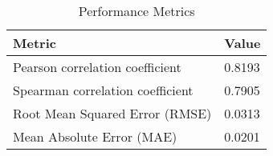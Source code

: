 \documentclass{article}
\begin{document}
    \begin{table}[h!]
    \centering
    \begin{tabular}{ll}
    \toprule
    Metric & Value \\
    \midrule
    Pearson correlation coefficient & 0.8193 \\
    Spearman correlation coefficient & 0.7905 \\
    Root Mean Squared Error (RMSE) & 0.0313 \\
    Mean Absolute Error (MAE) & 0.0201 \\
    \bottomrule
    \end{tabular}
    \caption{Performance Metrics}
    \label{tab:metrics}
    \end{table}

    
\end{document}
